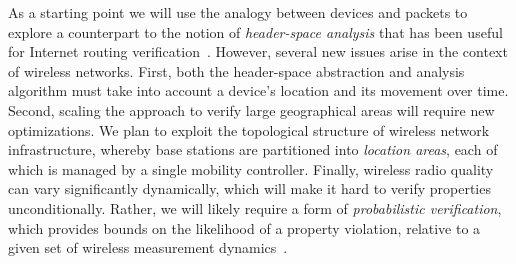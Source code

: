 %


As a starting point we will use the analogy between devices and packets to explore a counterpart to the notion of {\em header-space analysis} that has been useful for Internet routing verification~\cite{hsa}.  However, several new issues arise in the context of wireless networks.  First, both the header-space abstraction and analysis algorithm  must take into account a device's location and its movement over time.  Second, scaling the approach to verify large geographical areas will require new optimizations.  We plan to exploit the topological structure of wireless network infrastructure, whereby base stations are partitioned into {\em location areas}, each of which is managed by a single mobility controller.  Finally, wireless radio quality can vary significantly dynamically, which will make it hard to verify properties unconditionally.  Rather, we will likely require a form of {\em probabilistic verification}, which provides bounds on the likelihood of a property violation, relative to a given set of wireless measurement dynamics~\cite{probnetkat-esop16,probnetkat-popl17}. 


